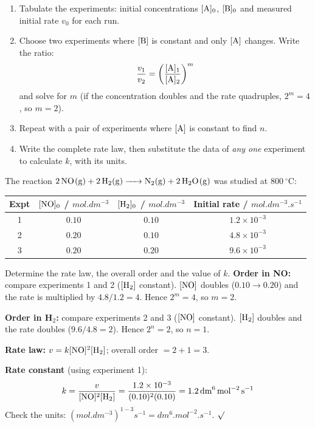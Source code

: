 \documentclass[11pt]{article}
\begin{document}
\begin{methode}
\begin{enumerate}
\item Tabulate the experiments: initial concentrations $[\ce{A}]_0$, $[\ce{B}]_0$ and measured initial rate $v_0$ for each run.
\item Choose two experiments where $[\ce{B}]$ is constant and only $[\ce{A}]$ changes. Write the ratio:
\[
\frac{v_1}{v_2} = \left(\frac{[\ce{A}]_1}{[\ce{A}]_2}\right)^{m}
\]
and solve for $m$ (if the concentration doubles and the rate quadruples, $2^m = 4$, so $m=2$).
\item Repeat with a pair of experiments where $[\ce{A}]$ is constant to find $n$.
\item Write the complete rate law, then substitute the data of \emph{any one} experiment to calculate $k$, with its units.
\end{enumerate}
\end{methode}

\begin{exoresolu}
The reaction $\ce{2NO(g) + 2H2(g) -> N2(g) + 2H2O(g)}$ was studied at $\SI{800}{\ensuremath{{}^{\circ}\mathrm{C}}}$:
\begin{center}
\begin{tabular}{|c|c|c|c|}
\hline
\rowcolor{popblueL} Expt & $[\ce{NO}]_0$ / $\si{mol.dm^{-3}}$ & $[\ce{H2}]_0$ / $\si{mol.dm^{-3}}$ & Initial rate / $\si{mol.dm^{-3}.s^{-1}}$ \\
\hline
1 & $0.10$ & $0.10$ & $1.2\times10^{-3}$ \\
\hline
2 & $0.20$ & $0.10$ & $4.8\times10^{-3}$ \\
\hline
3 & $0.20$ & $0.20$ & $9.6\times10^{-3}$ \\
\hline
\end{tabular}
\end{center}
Determine the rate law, the overall order and the value of $k$.
\tcblower
\textbf{Order in NO:} compare experiments 1 and 2 ($[\ce{H2}]$ constant). $[\ce{NO}]$ doubles ($0.10 \to 0.20$) and the rate is multiplied by $4.8/1.2 = 4$. Hence $2^m = 4$, so $m = 2$.

\textbf{Order in H$_2$:} compare experiments 2 and 3 ($[\ce{NO}]$ constant). $[\ce{H2}]$ doubles and the rate doubles ($9.6/4.8 = 2$). Hence $2^n = 2$, so $n = 1$.

\textbf{Rate law:} $v = k[\ce{NO}]^2[\ce{H2}]$; overall order $= 2 + 1 = 3$.

\textbf{Rate constant} (using experiment 1):
\[
k = \frac{v}{[\ce{NO}]^2[\ce{H2}]} = \frac{1.2\times10^{-3}}{(0.10)^2(0.10)} = \SI{1.2}{dm^6.mol^{-2}.s^{-1}}
\]
Check the units: $(\si{mol.dm^{-3}})^{1-3}\si{s^{-1}} = \si{dm^6.mol^{-2}.s^{-1}}$. $\surd$
\end{exoresolu}
\end{document}
